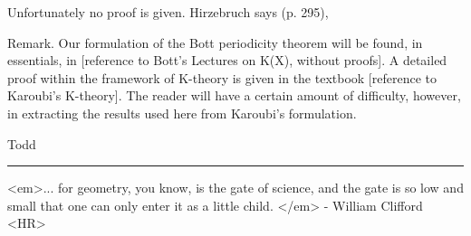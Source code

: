 Unfortunately no proof is given.  Hirzebruch says (p. 295), 

 Remark.  Our formulation of the Bott periodicity theorem 
 will be found, in essentials, in [reference to Bott's Lectures 
 on K(X), without proofs].  A detailed proof within the 
 framework of K-theory is given in the textbook [reference 
 to Karoubi's K-theory].  The reader will have a certain amount 
 of difficulty, however, in extracting the results used here from 
 Karoubi's formulation.

Todd
$$
    



\par\noindent\rule{\textwidth}{0.4pt}
<em>... for geometry, you
know, is the gate of science,
and the gate is so low and small that one can only enter it as a little child.
</em> - William Clifford  
<HR>



